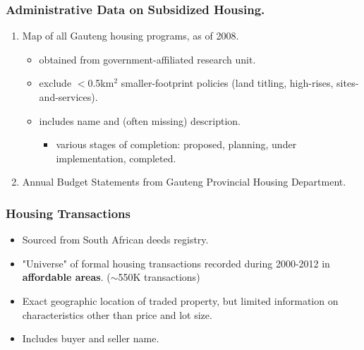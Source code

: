 \documentclass[aspectratio=32]{beamer}
\begin{document}

\begin{frame}
\frametitle{Administrative Data on Subsidized Housing.}
\begin{enumerate}

  \item Map of all Gauteng housing programs, as of 2008.
  \begin{itemize} 
    \item obtained from government-affiliated research unit.
    \item exclude $<$0.5km$^2$ smaller-footprint policies (land titling, high-rises, sites-and-services).
    \item includes name and (often missing) description. 
    \begin{itemize}
    \item various stages of completion: proposed, planning, under implementation, completed. 
    \end{itemize} 
  \end{itemize}

  \vspace{2mm}

  \item Annual Budget Statements from Gauteng Provincial Housing Department. 
  
\end{enumerate}
\end{frame}


\begin{frame}
\frametitle{Housing Transactions}

\begin{itemize}

  \item Sourced from South African deeds registry. 
  \vspace{2mm}
  \item "Universe" of formal housing transactions recorded during 2000-2012 in
{\bf affordable areas}. ($\sim$550K transactions)
  \vspace{2mm}
  \item Exact geographic location of traded property, but limited information
on characteristics other than price and lot size.
  \vspace{2mm}
  \item Includes buyer and seller name.
\end{itemize}
\end{frame}
\end{document}
